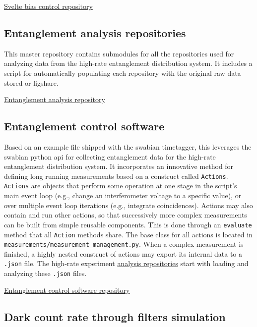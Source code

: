 \documentclass[11pt]{caltech_thesis} %
\begin{document}
\href{https://github.com/sansseriff/snspd-bias-controll-svelte}{Svelte bias control repository}

\hypertarget{entanglement-analysis-repositories}{%
\subsection{Entanglement analysis repositories}\label{entanglement-analysis-repositories}}

This master repository contains submodules for all the repositories used for analyzing data from the high-rate entanglement distribution system. It includes a script for automatically populating each repository with the original raw data stored or figshare.

\href{https://github.com/sansseriff/highrate_origin}{Entanglement analysis repository}

\hypertarget{entanglement-control-software}{%
\subsection{Entanglement control software}\label{entanglement-control-software}}

Based on an example file shipped with the swabian timetagger, this leverages the swabian python api for collecting entanglement data for the high-rate entanglement distribution system. It incorporates an innovative method for defining long running measurements based on a construct called \texttt{Actions}. \texttt{Actions} are objects that perform some operation at one stage in the script's main event loop (e.g., change an interferometer voltage to a specific value), or over multiple event loop iterations (e.g., integrate coincidences). Actions may also contain and run other actions, so that successively more complex measurements can be built from simple reusable components. This is done through an \texttt{evaluate} method that all \texttt{Action} methods share. The base class for all actions is located in \texttt{measurements/measurement\_management.py}. When a complex measurement is finished, a highly nested construct of actions may export its internal data to a \texttt{.json} file. The high-rate experiment \href{https://github.com/sansseriff/highrate_origin}{analysis repositories} start with loading and analyzing these \texttt{.json} files.

\href{https://github.com/sansseriff/swabian_entanglement_gui}{Entanglement control software repository}

\hypertarget{dark-count-rate-through-filters-simulation}{%
\subsection{Dark count rate through filters simulation}\label{dark-count-rate-through-filters-simulation}}
\end{document}
